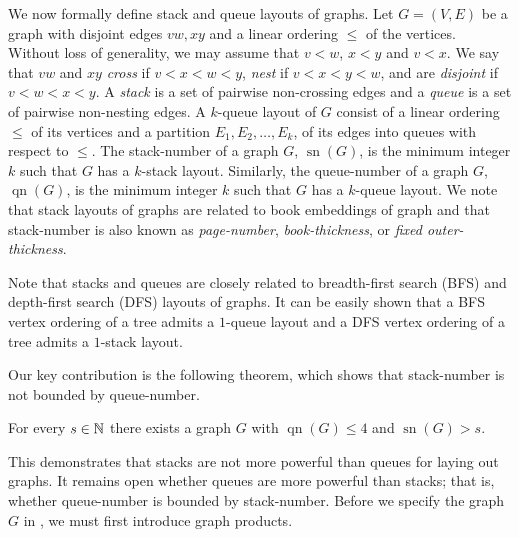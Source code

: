 \documentclass[kpfonts]{patmorin}
\DeclareMathOperator{\sn}{sn}
\DeclareMathOperator{\qn}{qn}
\renewcommand{\le}{\leqslant}
\renewcommand{\leq}{\leqslant}
\begin{document}
We now formally define stack and queue layouts of graphs. Let $G=(V,E)$ be a graph with disjoint edges $vw, xy$ and a linear ordering $\leq$ of the vertices. Without loss of generality, we may assume that $v < w$, $x <y$ and $v < x$. We say that $vw$ and $xy$ \textit{cross} if $v<x<w<y$,  \textit{nest} if $v <x <y < w$, and are \textit{disjoint} if $v <w<x<y$. A \textit{stack} is a set of pairwise non-crossing edges and a \textit{queue} is a set of pairwise non-nesting edges. A $k$-queue layout of $G$ consist of a linear ordering $\leq$ of its vertices and a partition $E_1,E_2, \dots, E_k$, of its edges into queues with respect to $\leq$. The stack-number of a graph $G$, $\sn(G)$, is the minimum integer $k$ such that $G$ has a $k$-stack layout. Similarly, the queue-number of a graph $G$, $\qn(G)$, is the minimum integer $k$ such that $G$ has a $k$-queue layout. We note that stack layouts of graphs are related to book embeddings of graph and that stack-number is also known as \textit{page-number}, \textit{book-thickness}, or \textit{fixed outer-thickness}.

Note that stacks and queues are closely related to breadth-first search (BFS) and depth-first search (DFS) layouts of graphs. It can be easily shown that a BFS vertex ordering of a tree admits a $1$-queue layout and a DFS vertex ordering of a tree admits a $1$-stack layout.


Our key contribution is the following theorem, which shows that stack-number is not bounded by queue-number.

\begin{thm}\label{family}
	For every $s\in \mathbb{N}$ there exists a graph $G$ with $\qn(G)\le 4$ and $\sn(G)>s$.
\end{thm}

This demonstrates that stacks are not more powerful than queues for laying out graphs. It remains open whether queues are more powerful than stacks; that is, whether queue-number is bounded by stack-number. Before we specify the graph $G$ in , we must first introduce graph products.
\end{document}
